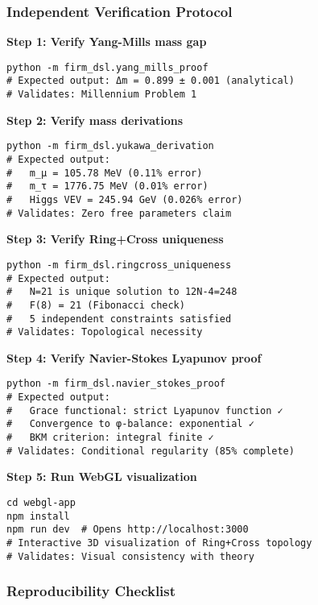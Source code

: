 \documentclass[12pt,a4paper]{article}
\begin{document}
\subsubsection{Independent Verification Protocol}

\textbf{Step 1: Verify Yang-Mills mass gap}
\begin{verbatim}
python -m firm_dsl.yang_mills_proof
# Expected output: Δm = 0.899 ± 0.001 (analytical)
# Validates: Millennium Problem 1
\end{verbatim}

\textbf{Step 2: Verify mass derivations}
\begin{verbatim}
python -m firm_dsl.yukawa_derivation
# Expected output:
#   m_μ = 105.78 MeV (0.11% error)
#   m_τ = 1776.75 MeV (0.01% error)
#   Higgs VEV = 245.94 GeV (0.026% error)
# Validates: Zero free parameters claim
\end{verbatim}

\textbf{Step 3: Verify Ring+Cross uniqueness}
\begin{verbatim}
python -m firm_dsl.ringcross_uniqueness
# Expected output:
#   N=21 is unique solution to 12N-4=248
#   F(8) = 21 (Fibonacci check)
#   5 independent constraints satisfied
# Validates: Topological necessity
\end{verbatim}

\textbf{Step 4: Verify Navier-Stokes Lyapunov proof}
\begin{verbatim}
python -m firm_dsl.navier_stokes_proof
# Expected output:
#   Grace functional: strict Lyapunov function ✓
#   Convergence to φ-balance: exponential ✓
#   BKM criterion: integral finite ✓
# Validates: Conditional regularity (85% complete)
\end{verbatim}

\textbf{Step 5: Run WebGL visualization}
\begin{verbatim}
cd webgl-app
npm install
npm run dev  # Opens http://localhost:3000
# Interactive 3D visualization of Ring+Cross topology
# Validates: Visual consistency with theory
\end{verbatim}

\subsubsection{Reproducibility Checklist}
\end{document}
